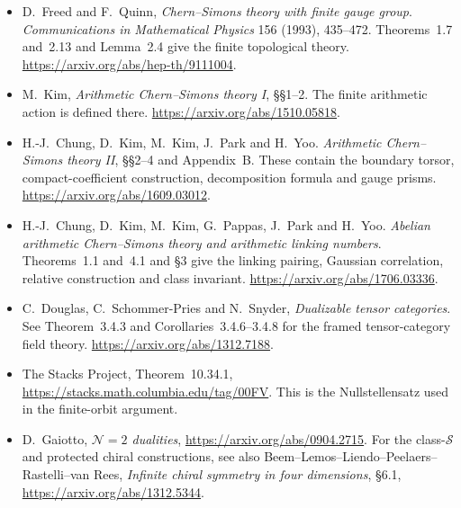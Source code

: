 \begin{itemize}
\item D.~Freed and F.~Quinn,
\emph{Chern--Simons theory with finite gauge group}. \emph{Communications in
Mathematical Physics} 156 (1993), 435--472. Theorems~1.7 and~2.13 and
Lemma~2.4 give the finite topological theory.
\url{https://arxiv.org/abs/hep-th/9111004}.
\item M.~Kim, \emph{Arithmetic Chern--Simons theory I}, \S\S1--2.
The finite arithmetic action is defined there.
\url{https://arxiv.org/abs/1510.05818}.
\item H.-J.~Chung, D.~Kim, M.~Kim, J.~Park and H.~Yoo.
\emph{Arithmetic Chern--Simons theory II}, \S\S2--4 and Appendix~B. These
contain the boundary torsor, compact-coefficient construction, decomposition
formula and gauge prisms. \url{https://arxiv.org/abs/1609.03012}.
\item H.-J.~Chung, D.~Kim, M.~Kim, G.~Pappas, J.~Park and H.~Yoo.
\emph{Abelian arithmetic Chern--Simons theory and arithmetic linking
numbers}. Theorems~1.1 and~4.1 and \S3 give the linking pairing, Gaussian
correlation, relative construction and class invariant.
\url{https://arxiv.org/abs/1706.03336}.
\item C.~Douglas, C.~Schommer-Pries and N.~Snyder,
\emph{Dualizable tensor categories}. See Theorem~3.4.3 and
Corollaries~3.4.6--3.4.8 for the framed tensor-category field theory.
\url{https://arxiv.org/abs/1312.7188}.
\item The Stacks Project, Theorem~10.34.1,
\url{https://stacks.math.columbia.edu/tag/00FV}. This is the Nullstellensatz
used in the finite-orbit argument.
\item D.~Gaiotto, \emph{\(\mathcal N=2\) dualities},
\url{https://arxiv.org/abs/0904.2715}. For the class-\(\mathcal S\) and
protected chiral constructions, see also
Beem--Lemos--Liendo--Peelaers--Rastelli--van Rees, \emph{Infinite chiral
symmetry in four dimensions}, \S6.1, \url{https://arxiv.org/abs/1312.5344}.
\end{itemize}
